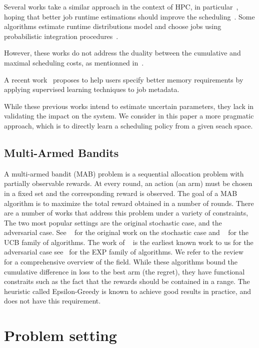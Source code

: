 \documentclass[sigconf]{acmart}
\begin{document}
Several works take a similar approach in the context of HPC, in
particular~\cite{Tsafrir_easypp_2005,learningruntimes}, hoping that better job
runtime estimations should improve the scheduling~\cite{chiang_impact_2002}.
Some algorithms estimate runtime distributions model and choose jobs using
probabilistic integration procedures~\cite{Nissimov2008}.

However, these works do not address the duality between the cumulative and
maximal scheduling costs, as mentionned in~\cite{learningruntimes}.

A recent work~\cite{mlmem} proposes to help
users specify better memory requirements by applying supervised learning
techniques to job metadata.

While these previous works intend to estimate uncertain parameters, they lack
in validating the impact on the system. We consider in this paper a more
pragmatic approach, which is to directly learn a scheduling policy from a given
seach space.

\subsection{Multi-Armed Bandits}

A multi-armed bandit (MAB) problem is a sequential allocation problem with
partially observable rewards. At every round, an action (an arm) must be chosen
in a fixed set and the corresponding reward is observed. The goal of a MAB
algorithm is to maximize the total reward obtained in a number of rounds.
There are a number of works that address this problem under a variety of
constraints, The two most popular settings are the original stochastic  case,
and the adversarial case. See ~\cite{thompson} for the original work on the
stochastic case and ~\cite{Auer2002} for the UCB family of algorithms. The work
of ~\cite{Banos} is the earliest known work to us for the adversarial case
see~\cite{nonstoch} for the EXP family of algorithms. We refer to the
review~\cite{bubnow} for a comprehensive overview of the field. While these
algorithms bound the cumulative difference in loss to the best arm (the
regret), they have functional constraits such as the fact that the rewards
should be contained in a range. The\cite{Auer2002} heuristic called
Epsilon-Greedy is known to achieve good results in practice, and does not have
this requirement.

\section{Problem setting}
\label{sec:problem_setting}
\end{document}
